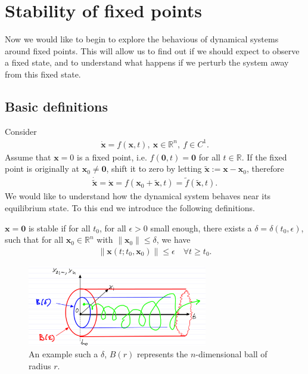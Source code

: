 \chapter{Stability of fixed points}
Now we would like to begin to explore the behavious of dynamical systems around fixed points. This will allow us to find out if we should expect to observe a fixed state, and to understand what happens if we perturb the system away from this fixed state.
\section{Basic definitions}
Consider
\begin{align}
	\dot{ \bm{x}}=f( \bm{x},t),\  \bm{x} \in \mathbb{R}^{n},\ f\in C^{1}.
\end{align}
Assume that $ \bm{x}=0$ is a fixed point, i.e. $f(\bm{0},t) = \bm{0}$ for all $t \in \mathbb{R}$. If the fixed point is originally at $\bm{x}_0\neq \bm{0}$, shift it to zero by letting $\tilde{ \bm{x}}:= \bm{x}- \bm{x}_0$, therefore 
\begin{align}
	\dot{\tilde{ \bm{x}}} = \dot{ \bm{x}} = f( \bm{x}_0 + \tilde{ \bm{x}}, t) = \tilde{f}(\tilde{ \bm{x}}, t).
\end{align}
We would like to understand how the dynamical system behaves near its equilibrium state. To this end we introduce the following definitions.
\begin{definition}
	$ \bm{x}=\bm{0}$ is stable if for all $t_0$, for all $\epsilon>0$ small enough, there exists a $\delta=\delta(t_0, \epsilon)$, such that for all $ \bm{x}_0 \in \mathbb{R}^{n}$ with $\| \bm{x}_0\| \leq \delta$, we have 
	\begin{align}
		\left \|  \bm{x}(t;t_0,  \bm{x}_0) \right\| \leq \epsilon \quad \forall t \geq t_0.
	\end{align}
\begin{figure}[h!]
	\centering
	\includegraphics[width=0.7\textwidth]{figures/ch2/1lyapunov_stability.png}
	\caption{An example such a $\delta$, $B(r)$ represents the $n$-dimensional ball of radius $r$.}
	\label{fig:lyapunov_stability_def}
\end{figure}
\end{definition}

